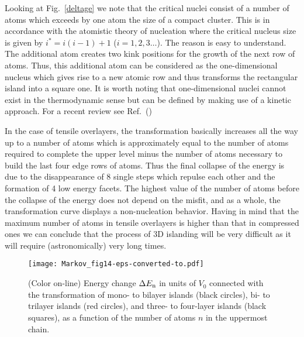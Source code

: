\documentclass[aps,prl,showpacs,twocolumn,byrevtex,floatfix]{revtex4-1}
\begin{document}
Looking at Fig.\ \ref{deltage} we note that the critical nuclei consist of a
number of atoms which exceeds by one atom the size of a compact cluster.
This is in accordance with the atomistic theory of nucleation where the
critical nucleus size is given by $i^* = i(i-1) +1$ ($i = 1, 2,
3\hdots$).\cite{Kashchiev08} The reason is easy to understand. The additional
atom creates two kink positions for the growth of the next row of atoms. Thus,
this additional atom can be considered as the one-dimensional nucleus which
gives rise to a new atomic row and thus transforms the rectangular island into a
square one. It is worth noting that one-dimensional nuclei cannot exist in the
thermodynamic sense but can be defined by making use of a kinetic
approach.\cite{Voronkov70,Frank74,Zhang90} For a recent review see
Ref.~()

In the case of tensile overlayers, the transformation basically increases 
all the way up to a number of atoms which is approximately equal to the 
number of atoms required to complete the upper level minus the number
of atoms necessary to build the last four edge rows of atoms. 
Thus the final collapse of the energy is due
to the disappearance of 8 single steps which repulse each other and the
formation of 4 low energy facets. The highest value of the number of atoms
before the collapse of the energy does not depend on the misfit, and as a
whole, the transformation curve displays a non-nucleation behavior. Having in
mind that the maximum number of atoms in tensile overlayers is higher than that
in compressed ones we can conclude that the process of 3D islanding will be 
very difficult as it will require (astronomically) very long times.



\begin{figure}[htb]
\texttt{[image: Markov\_fig14-eps-converted-to.pdf]}
\caption{\label{thick-islands} (Color on-line) Energy change $\Delta E_{\rm
n}$ in units of $V_0$ connected with the transformation of mono- to bilayer
islands (black circles), bi- to trilayer islands (red circles), and three- to
four-layer islands (black squares), as a function of the number of atoms $n$ in
the uppermost chain.}
\end{figure}
\end{document}
